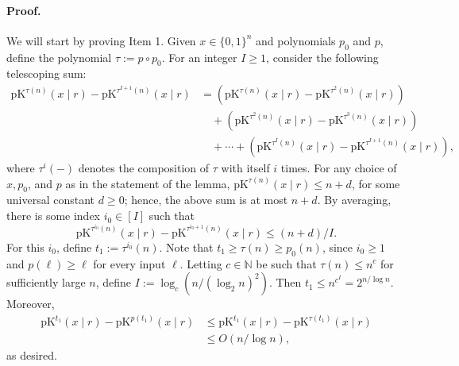 \paragraph{Proof.} We will start by proving Item 1. Given $x\in\{0,1\}^n$ and polynomials $p_0$ and $p$, define the polynomial $\tau:=p\circ p_0$. For an integer $I\geq1$, consider the following telescoping sum:
\begin{align*}
\mathrm{pK}^{\tau(n)}(x\mid r)-\mathrm{pK}^{\tau^{I+1}(n)}(x\mid r)
&=(\mathrm{pK}^{\tau(n)}(x\mid r)-\mathrm{pK}^{\tau^2(n)}(x\mid r))\\
&\quad+(\mathrm{pK}^{\tau^2(n)}(x\mid r)-\mathrm{pK}^{\tau^3(n)}(x\mid r))\\
&\quad+\cdots+(\mathrm{pK}^{\tau^I(n)}(x\mid r)-\mathrm{pK}^{\tau^{I+1}(n)}(x\mid r)),
\end{align*}
where $\tau^i(-)$ denotes the composition of $\tau$ with itself $i$ times. For any choice of $x,p_0$, and $p$ as in the statement of the lemma, $\mathrm{pK}^{\tau(n)}(x\mid r)\leq n+d$, for some universal constant $d\geq0$; hence, the above sum is at most $n+d$. By averaging, there is some index $i_0\in[I]$ such that
\[\mathrm{pK}^{\tau^{i_0}(n)}(x\mid r)-\mathrm{pK}^{\tau^{i_0+1}(n)}(x\mid r)\leq(n+d)/I.\]
For this $i_0$, define $t_1:=\tau^{i_0}(n)$. Note that $t_1\geq\tau(n)\geq p_0(n)$, since $i_0\geq1$ and $p(\ell)\geq\ell$ for every input $\ell$. Letting $c\in\mathbb N$ be such that $\tau(n)\leq n^c$ for sufficiently large $n$, define $I:=\log_c(n/(\log_2n)^2)$. Then $t_1\leq n^{c^I}=2^{n/\log n}$. Moreover,
\begin{align*}
\mathrm{pK}^{t_1}(x\mid r)-\mathrm{pK}^{p(t_1)}(x\mid r)&\leq\mathrm{pK}^{t_1}(x\mid r)-\mathrm{pK}^{\tau(t_1)}(x\mid r)\\
&\leq O(n/\log n),
\end{align*}
as desired.
